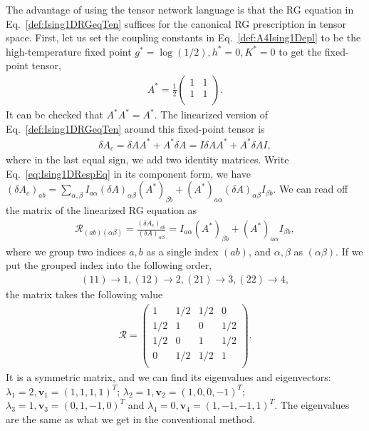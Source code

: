 \documentclass[aps,prr,reprint,superscriptaddress,floatfix]{revtex4-2}
\begin{document}
The advantage of using the tensor network language is that the RG equation in Eq.~\eqref{def:Ising1DRGeqTen} suffices for the canonical RG prescription in tensor space. 
First, let us set the coupling constants in Eq.~\eqref{def:A4Ising1Depl} to be the high-temperature fixed point $g^* = \log{\left(1/2\right)}, h^*=0, K^* = 0$ to get the fixed-point tensor,
%
\begin{align}\label{eq:fixedA4Ising1D}
    A^* = \frac{1}{2}
\begin{pmatrix}
    1 & 1 \\
    1 & 1 \\
\end{pmatrix}.
\end{align}
%
It can be checked that $A^* A^* = A^*$. 
The linearized version of Eq.~\eqref{def:Ising1DRGeqTen} around this fixed-point tensor is
%
\begin{align}\label{eq:Ising1DRespEq}
    \delta A_c = \delta A A^* + A^* \delta A = I \delta A A^* + A^*
    \delta A I,
\end{align}
%
where in the last equal sign, we add two identity matrices. 
Write Eq.~\eqref{eq:Ising1DRespEq} in its component form, we have $\left(\delta A_c\right)_{ab} = \sum_{\alpha,\beta}I_{a\alpha}\left(\delta A\right)_{\alpha\beta} \left(A^*\right)_{\beta b} + \left(A^*\right)_{a\alpha} \left(\delta A\right)_{\alpha \beta} I_{\beta b}$. 
We can read off the matrix of the linearized RG equation as
%
\begin{align}\label{eq:Ising1DRespMat}
    \mathcal{R}_{(ab)(\alpha \beta)} = \frac{\left(\delta
    A_c\right)_{ab}}{\left(\delta A\right)_{\alpha \beta}} =
    I_{a\alpha}\left(A^*\right)_{\beta b} + \left(A^*\right)_{a\alpha}
    I_{\beta b},
\end{align}
%
where we group two indices $a,b$ as a single index $(ab)$, and $\alpha,\beta$ as $(\alpha\beta)$. 
If we put the grouped index into the following order,
%
\begin{align}\label{def:orderConvention}
    (11) \rightarrow 1, (12) \rightarrow 2, (21) \rightarrow 3, (22)
    \rightarrow 4,
\end{align}
%
the matrix takes the following value
%
\begin{align}\label{eq:Ising1DRespMatNum}
    \mathcal{R} = 
\begin{pmatrix}
    1 & 1/2 & 1/2 & 0 \\
    1/2 & 1 & 0 & 1/2 \\
    1/2 & 0 & 1 & 1/2 \\
    0 & 1/2 & 1/2 & 1 \\
\end{pmatrix}.
\end{align}
%
It is a symmetric matrix, and we can find its eigenvalues and eigenvectors: $\lambda_1 = 2,\mathbf{v}_1 = (1,1,1,1)^T$; $\lambda_2 = 1,\mathbf{v}_2 = (1,0,0,-1)^T$; $\lambda_3 =1, \mathbf{v}_3 = (0,1,-1,0)^T$ and $\lambda_4 = 0, \mathbf{v}_4 = (1,-1,-1,1)^T$. 
The eigenvalues are the same as what we get in the conventional method. 
%
\end{document}

